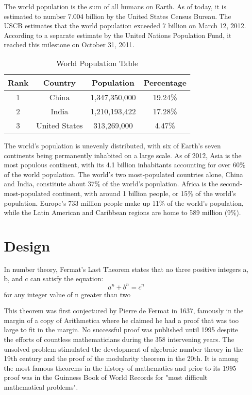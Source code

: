 \documentclass{fisatproject}
\begin{document}
The world population is the sum of all humans on Earth. As of today, it is estimated to number 7.004 billion by the United States Census Bureau. The USCB estimates that the world population exceeded 7 billion on March 12, 2012. According to a separate estimate by the United Nations Population Fund, it reached this milestone on October 31, 2011.
\begin{table}[h!]
\begin{center}
\begin{tabular}{|c|c|c|c|}
\hline Rank & Country & Population  & Percentage  \\ 
\hline 1 & China & 1,347,350,000 & 19.24\% \\ 
\hline 2 & India & 1,210,193,422  & 17.28\% \\ 
\hline 3 & United States & 313,269,000 & 4.47\% \\ 
\hline 
\end{tabular}
\caption{World Population Table} 
\end{center}
\end{table}
The world's population is unevenly distributed, with six of Earth's seven continents being permanently inhabited on a large scale. As of 2012, Asia is the most populous continent, with its 4.1 billion inhabitants accounting for over 60\% of the world population. The world's two most-populated countries alone, China and India, constitute about 37\% of the world's population. Africa is the second-most-populated continent, with around 1 billion people, or 15\% of the world's population. Europe's 733 million people make up 11\% of the world's population, while the Latin American and Caribbean regions are home to 589 million (9\%).


\chapter{Design}

In number theory, Fermat's Last Theorem states that no three positive integers a, b, and c can satisfy the equation:
$$
a^{n} + b^{n} = c^{n}
$$ 
for any integer value of n greater than two 

This theorem was first conjectured by Pierre de Fermat in 1637, famously in the margin of a copy of Arithmetica where he claimed he had a proof that was too large to fit in the margin. No successful proof was published until 1995 despite the efforts of countless mathematicians during the 358 intervening years. The unsolved problem stimulated the development of algebraic number theory in the 19th century and the proof of the modularity theorem in the 20th. It is among the most famous theorems in the history of mathematics and prior to its 1995 proof was in the Guinness Book of World Records for "most difficult mathematical problems".
\end{document}
